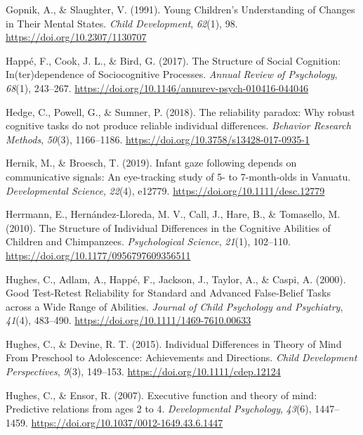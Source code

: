 \documentclass[
  man,floatsintext]{apa6}
\newlength{\cslhangindent}
\newlength{\cslentryspacingunit} %
\newenvironment{CSLReferences}[2] %
 {%
  \setlength{\parindent}{0pt}
  \ifodd #1
  \let\oldpar\par
  \def\par{\hangindent=\cslhangindent\oldpar}
  \fi
  \setlength{\parskip}{#2\cslentryspacingunit}
 }%
 {}
\begin{document}
\begin{CSLReferences}{1}{0}
\leavevmode{}%
Gopnik, A., \& Slaughter, V. (1991). Young {Children}'s {Understanding} of {Changes} in {Their Mental States}. \emph{Child Development}, \emph{62}(1), 98. \url{https://doi.org/10.2307/1130707}

\leavevmode{}%
Happé, F., Cook, J. L., \& Bird, G. (2017). The {Structure} of {Social Cognition}: {In}(ter)dependence of {Sociocognitive Processes}. \emph{Annual Review of Psychology}, \emph{68}(1), 243--267. \url{https://doi.org/10.1146/annurev-psych-010416-044046}

\leavevmode{}%
Hedge, C., Powell, G., \& Sumner, P. (2018). The reliability paradox: {Why} robust cognitive tasks do not produce reliable individual differences. \emph{Behavior Research Methods}, \emph{50}(3), 1166--1186. \url{https://doi.org/10.3758/s13428-017-0935-1}

\leavevmode{}%
Hernik, M., \& Broesch, T. (2019). Infant gaze following depends on communicative signals: {An} eye-tracking study of 5- to 7-month-olds in {Vanuatu}. \emph{Developmental Science}, \emph{22}(4), e12779. \url{https://doi.org/10.1111/desc.12779}

\leavevmode{}%
Herrmann, E., Hernández-Lloreda, M. V., Call, J., Hare, B., \& Tomasello, M. (2010). The {Structure} of {Individual Differences} in the {Cognitive Abilities} of {Children} and {Chimpanzees}. \emph{Psychological Science}, \emph{21}(1), 102--110. \url{https://doi.org/10.1177/0956797609356511}

\leavevmode{}%
Hughes, C., Adlam, A., Happé, F., Jackson, J., Taylor, A., \& Caspi, A. (2000). Good {Test}-{Retest Reliability} for {Standard} and {Advanced False}-{Belief Tasks} across a {Wide Range} of {Abilities}. \emph{Journal of Child Psychology and Psychiatry}, \emph{41}(4), 483--490. \url{https://doi.org/10.1111/1469-7610.00633}

\leavevmode{}%
Hughes, C., \& Devine, R. T. (2015). Individual {Differences} in {Theory} of {Mind From Preschool} to {Adolescence}: {Achievements} and {Directions}. \emph{Child Development Perspectives}, \emph{9}(3), 149--153. \url{https://doi.org/10.1111/cdep.12124}

\leavevmode{}%
Hughes, C., \& Ensor, R. (2007). Executive function and theory of mind: {Predictive} relations from ages 2 to 4. \emph{Developmental Psychology}, \emph{43}(6), 1447--1459. \url{https://doi.org/10.1037/0012-1649.43.6.1447}


\end{CSLReferences}
\end{document}
